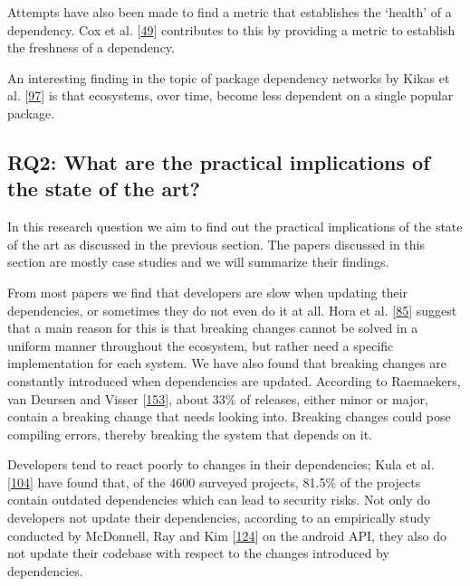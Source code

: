 \documentclass[]{book}
\begin{document}
Attempts have also been made to find a metric that establishes the
`health' of a dependency. Cox et al.
{[}\protect\hyperlink{ref-Cox2015}{49}{]} contributes to this by
providing a metric to establish the freshness of a dependency.

An interesting finding in the topic of package dependency networks by
Kikas et al. {[}\protect\hyperlink{ref-Kikas2017}{97}{]} is that
ecosystems, over time, become less dependent on a single popular
package.

\subsection{RQ2: What are the practical implications of the state of the
art?}\label{rq2-what-are-the-practical-implications-of-the-state-of-the-art}

In this research question we aim to find out the practical implications
of the state of the art as discussed in the previous section. The papers
discussed in this section are mostly case studies and we will summarize
their findings.

From most papers we find that developers are slow when updating their
dependencies, or sometimes they do not even do it at all. Hora et al.
{[}\protect\hyperlink{ref-Hora2016}{85}{]} suggest that a main reason
for this is that breaking changes cannot be solved in a uniform manner
throughout the ecosystem, but rather need a specific implementation for
each system. We have also found that breaking changes are constantly
introduced when dependencies are updated. According to Raemaekers, van
Deursen and Visser {[}\protect\hyperlink{ref-Raemaekers2017}{153}{]},
about 33\% of releases, either minor or major, contain a breaking change
that needs looking into. Breaking changes could pose compiling errors,
thereby breaking the system that depends on it.

Developers tend to react poorly to changes in their dependencies; Kula
et al. {[}\protect\hyperlink{ref-Kula2017}{104}{]} have found that, of
the 4600 surveyed projects, 81.5\% of the projects contain outdated
dependencies which can lead to security risks. Not only do developers
not update their dependencies, according to an empirically study
conducted by McDonnell, Ray and Kim
{[}\protect\hyperlink{ref-McDonnell2013}{124}{]} on the android API,
they also do not update their codebase with respect to the changes
introduced by dependencies.
\end{document}
